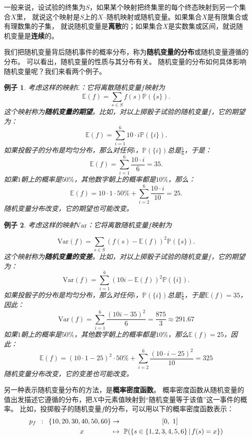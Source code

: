 \documentclass[12pt,UTF8]{ctexbook}
\newtheorem{ex}{例子}[section]
\begin{document}
一般来说，设试验的终集为$S$，如果某个映射把终集里的每个终态映射到另一个集合$X$里，
就说这个映射是$S$上的$X$–随机映射或随机变量。如果集合$X$是有限集合或有理数集的子集，
就说随机变量是\textbf{离散}的；如果集合$X$是实数集或区间，就说随机变量是\textbf{连续}的。

我们把随机变量背后随机事件的概率分布，称为\textbf{随机变量的分布}或随机变量遵循的分布。
可以看出，随机变量的性质与其分布有关。
随机变量的分布如何具体影响随机变量呢？我们来看两个例子。
\begin{ex}
    考虑这样的映射$\mathbb{E}$：它将离散随机变量$f$映射为
    $$ \mathbb{E}(f) = \sum_{s\in S} f(s) \mathbb{P}(\{s\}).$$
    这个映射称为\textbf{随机变量的期望}。比如，对以上掷骰子试验的随机变量$f$，它的期望为：
    $$ \mathbb{E}(f) = \sum_{i=1}^6 10\cdot i \mathbb{P}(\{i\}).$$
    如果投骰子的分布是均匀分布，那么对任何$i$​，$\mathbb{P}(\{i\})$​总是$\frac{1}{6}$​，于是：
    $$ \mathbb{E}(f) = \sum_{i=1}^6 \frac{10\cdot i}{6} = 35. $$
    如果$1$朝上的概率是$50\%$，其他数字朝上的概率都是$10\%$​，那么：
    $$ \mathbb{E}(f) = 10\cdot 1\cdot 50\% + \sum_{i=2}^6 \frac{10\cdot i}{10} = 25. $$
    随机变量分布改变，它的期望也可能改变。
\end{ex}
\begin{ex}
    考虑这样的映射$\mathrm{Var}$：它将离散随机变量$f$映射为

    $$ \mathrm{Var}(f) = \sum_{s\in S} \left(f(s) - \mathbb{E}(f)\right)^2 \mathbb{P}(\{s\}).$$
    这个映射称为\textbf{随机变量的变差}。比如，对以上掷骰子试验的随机变量$f$，它的期望为：
    $$ \mathrm{Var}(f) = \sum_{i=1}^6 \left(10i - \mathbb{E}(f)\right)^2 \mathbb{P}(\{i\}).$$
    如果投骰子的分布是均匀分布，那么对任何$i$，$\mathbb{P}(\{i\})$总是$\frac{1}{6}$，于是$\mathbb{E}(f) = 35$，因此：
    $$\mathrm{Var}(f) = \sum_{i=1}^6 \frac{\left(10i - 35\right)^2}{6} = \frac{875}{3} \approx 291.67$$    
    如果$1$朝上的概率是$50\%$，其他数字朝上的概率都是$10\%$，那么$\mathbb{E}(f) = 25$，因此：    
    $$ \mathbb{E}(f) = (10\cdot 1 - 25)^2\cdot 50\% + \sum_{i=2}^6 \frac{(10\cdot i - 25)^2}{10} = 325 $$
    随机变量分布改变，它的变差也可能改变。
\end{ex}

另一种表示随机变量分布的方法，是\textbf{概率密度函数}。
概率密度函数从随机变量的值出发描述它遵循的分布，把$X$中元素值映射到“随机变量等于该值”这一事件的概率。
比如，投掷骰子的随机变量$f$的分布，可以用以下的概率密度函数表示：
\begin{align}
p_f \,\,\, : \,\,\,  \{10,20,30,40,50,60\} &\rightarrow \qquad\qquad\qquad [0, \,\, 1] \notag \\
  x\qquad\qquad &\mapsto \,\, \mathbb{P}(\{s \in \{1,2,3,4,5,6\} \,|\, f(s) = x\}) \notag 
\end{align}
\end{document}
